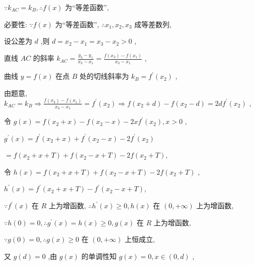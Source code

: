 \documentclass[10pt]{article}
\begin{document}
\(\because {k}_{AC} = {k}_{B},\therefore f\left( x\right)\) 为“等差函数”,

必要性: \(\because f\left( x\right)\) 为“等差函数”, \(\therefore {x}_{1},{x}_{2},{x}_{3}\) 成等差数列,

设公差为 \(d\) ,则 \(d = {x}_{2} - {x}_{1} = {x}_{3} - {x}_{2} > 0\) ,

直线 \({AC}\) 的斜率 \({k}_{AC} = \frac{{y}_{3} - {y}_{1}}{{x}_{3} - {x}_{1}} = \frac{f\left( {x}_{3}\right)  - f\left( {x}_{1}\right) }{{x}_{3} - {x}_{1}}\) ,

曲线 \(y = f\left( x\right)\) 在点 \(B\) 处的切线斜率为 \({k}_{B} = {f}^{\prime }\left( {x}_{2}\right)\) ,

由题意, \({k}_{AC} = {k}_{B} \Rightarrow  \frac{f\left( {x}_{3}\right)  - f\left( {x}_{1}\right) }{{x}_{3} - {x}_{1}} = {f}^{\prime }\left( {x}_{2}\right)  \Rightarrow  f\left( {{x}_{2} + d}\right)  - f\left( {{x}_{2} - d}\right)  = {2d}{f}^{\prime }\left( {x}_{2}\right)\) ,

令 \(g\left( x\right)  = f\left( {{x}_{2} + x}\right)  - f\left( {{x}_{2} - x}\right)  - {2x}{f}^{\prime }\left( {x}_{2}\right) ,x > 0\) ,

\({g}^{\prime }\left( x\right)  = {f}^{\prime }\left( {{x}_{2} + x}\right)  + {f}^{\prime }\left( {{x}_{2} - x}\right)  - 2{f}^{\prime }\left( {x}_{2}\right)\)

\(= f\left( {{x}_{2} + x + T}\right)  + f\left( {{x}_{2} - x + T}\right)  - {2f}\left( {{x}_{2} + T}\right) ,\)

令 \(h\left( x\right)  = f\left( {{x}_{2} + x + T}\right)  + f\left( {{x}_{2} - x + T}\right)  - {2f}\left( {{x}_{2} + T}\right)\) ,

\({h}^{\prime }\left( x\right)  = {f}^{\prime }\left( {{x}_{2} + x + T}\right)  - {f}^{\prime }\left( {{x}_{2} - x + T}\right) ,\)

\(\because {f}^{\prime }\left( x\right)\) 在 \(R\) 上为增函数, \(\therefore {h}^{\prime }\left( x\right)  \geq  0,h\left( x\right)\) 在 \(\left( {0, + \infty }\right)\) 上为增函数,

\(\because h\left( 0\right)  = 0,\therefore {g}^{\prime }\left( x\right)  = h\left( x\right)  \geq  0,g\left( x\right)\) 在 \(R\) 上为增函数,

\(\because g\left( 0\right)  = 0,\therefore g\left( x\right)  \geq  0\) 在 \(\left( {0, + \infty }\right)\) 上恒成立,

又 \(g\left( d\right)  = 0\) ,由 \(g\left( x\right)\) 的单调性知 \(g\left( x\right)  = 0,x \in  \left( {0,d}\right)\) ,
\end{document}
